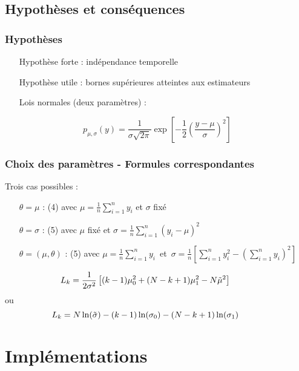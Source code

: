 \documentclass{beamer}
\begin{document}
\subsection{Hypothèses et conséquences}

\begin{frame}
	\frametitle{Hypothèses}
	\begin{itemize}
		\item[Hypothèse] forte : indépendance temporelle
		\item[Hypothèse] utile : bornes supérieures atteintes aux estimateurs
		\item[Lois] normales (deux paramètres) :
	\end{itemize}
	\begin{equation}
		p_{\mu, \sigma}(y) = \frac1{\sigma\sqrt{2 \pi}} \exp \left[ -\frac12 \left( \frac{y - \mu}{\sigma} \right)^2 \right]
	\end{equation}
\end{frame}

\begin{frame}
	\frametitle{Choix des paramètres - Formules correspondantes}
	Trois cas possibles :
	\vspace*{.3cm}
	\begin{itemize}
		\item[$\theta=\mu$]: (4) avec $\mu=\frac1n\sum_{i=1}^ny_i$ et $\sigma$ fixé
		\vspace*{.2cm}
		\item[$\theta=\sigma$]:  (5) avec $\mu$ fixé et $\sigma=\frac1n\sum_{i=1}^n(y_i-\mu)^2$
		\vspace*{.2cm}
		\item[$\theta=(\mu,\theta)$]: (5) avec \mbox{$\mu=\frac1n\sum_{i=1}^ny_i$ et $\sigma=\frac1n\left[\sum_{i=1}^ny_i^2-(\sum_{i=1}^ny_i)^2\right]$}
	\end{itemize}
	\vspace*{0.8cm}
	\begin{equation}
	\hspace{-1cm}	L_k=\frac 1{2\sigma^2}\left[(k-1)\mu_0^2+(N-k+1)\mu_1^2-N\tilde\mu^2\right]
	\end{equation}
	ou
	\begin{equation}
	\hspace{-1cm}	L_k=N\ln(\tilde\sigma)-(k-1)\ln(\sigma_0)-(N-k+1)\ln(\sigma_1)
	\end{equation}
\end{frame}

\section{Implémentations}
\end{document}
